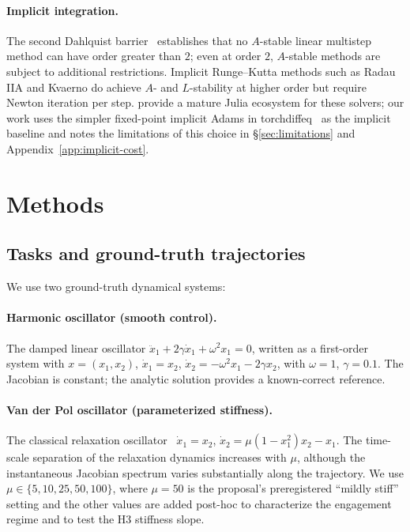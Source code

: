 \documentclass[11pt]{article}
\theoremstyle{plain}
\theoremstyle{definition}
\begin{document}
\paragraph{Implicit integration.}
The second Dahlquist barrier~\citep{dahlquist1963special} establishes that no
$A$-stable linear multistep method can have order greater than $2$; even at
order $2$, $A$-stable methods are subject to additional restrictions. Implicit
Runge--Kutta methods such as Radau IIA and Kvaerno do
achieve $A$- and $L$-stability at higher order but require Newton iteration
per step. \citet{rackauckas2017differentialequations} provide a mature Julia
ecosystem for these solvers; our work uses the simpler fixed-point implicit
Adams in torchdiffeq~\citep{chen2018torchdiffeq} as the implicit baseline and
notes the limitations of this choice in \S\ref{sec:limitations} and
Appendix~\ref{app:implicit-cost}.

\section{Methods}
\label{sec:methods}

\subsection{Tasks and ground-truth trajectories}
\label{sec:tasks}

We use two ground-truth dynamical systems:

\paragraph{Harmonic oscillator (smooth control).}
The damped linear oscillator $\ddot x_1 + 2\gamma \dot x_1 + \omega^2 x_1 = 0$,
written as a first-order system with $x = (x_1, x_2)$, $\dot x_1 = x_2$,
$\dot x_2 = -\omega^2 x_1 - 2\gamma x_2$, with $\omega = 1$, $\gamma = 0.1$.
The Jacobian is constant; the analytic solution provides a known-correct
reference.

\paragraph{Van der Pol oscillator (parameterized stiffness).}
The classical relaxation oscillator~\citep{vanderpol1926relaxation}
$\dot x_1 = x_2$, $\dot x_2 = \mu (1 - x_1^2) x_2 - x_1$. The time-scale
separation of the relaxation dynamics increases with $\mu$, although the
instantaneous Jacobian spectrum varies substantially along the trajectory. We
use $\mu \in \{5, 10, 25, 50, 100\}$, where
$\mu = 50$ is the proposal's preregistered ``mildly stiff'' setting and
the other values are added post-hoc to characterize the engagement regime
and to test the H3 stiffness slope.
\end{document}
